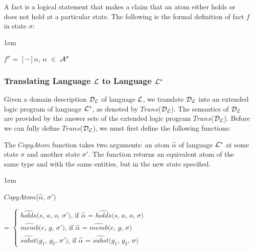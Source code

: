 \documentclass[global,twocolumn,final]{svjour}
\newenvironment{vquote}
  {\begin{list}{}{\leftmargin 1em}\item[]}
  {\end{list}}
\begin{document}
          A fact is a logical statement that makes a claim that an atom either
          holds or does not hold at a particular state. The following is the
          formal definition of fact $f$ in state $\sigma$:

          \begin{vquote}
            $f^{\sigma}$ = $[\lnot]$$\alpha$, $\alpha$ $\in$ ${\cal A}^{\sigma}$
          \end{vquote}

      \subsubsection{Translating Language ${\cal L}$ to Language ${\cal L^{*}}$}

        Given a domain description ${\cal D_{L}}$ of language ${\cal L}$, we
        translate ${\cal D_{L}}$ into an extended logic program of language
        ${\cal L^{*}}$, as denoted by $Trans$(${\cal D_{L}}$). The semantics of
        ${\cal D_{L}}$ are provided by the answer sets of the extended logic
        program $Trans$(${\cal D_{L}}$). Before we can fully define
        $Trans$(${\cal D}_{\cal L}$), we must first define the following
        functions:

        The $CopyAtom$ function takes two arguments: an atom $\hat{\alpha}$
        of language ${\cal L}^{*}$ at some state $\sigma$ and another state
        $\sigma'$. The function returns an equivalent atom of the same type
        and with the same entities, but in the new state specified.

        \begin{vquote}
          $CopyAtom$($\hat{\alpha}$, $\sigma'$)

          \hspace{1em}
          =
          \begin{math}
            \begin{cases}
              \mbox{$\hat{holds}$($s$, $a$, $o$, $\sigma'$), if $\hat{\alpha}$ = $\hat{holds}$($s$, $a$, $o$, $\sigma$)} \\
              \mbox{$\hat{memb}$($e$, $g$, $\sigma'$), if $\hat{\alpha}$ = $\hat{memb}$($e$, $g$, $\sigma$)} \\
              \mbox{$\hat{subst}$($g_{1}$, $g_{2}$, $\sigma'$), if $\hat{\alpha}$ = $\hat{subst}$($g_{1}$, $g_{2}$, $\sigma$)}
            \end{cases}
          \end{math}
        \end{vquote}
\end{document}
